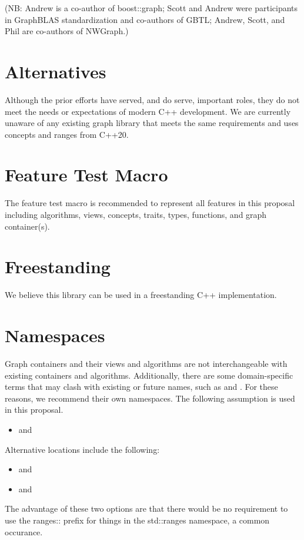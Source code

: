 (NB: Andrew is a co-author of boost::graph; 
Scott and Andrew were participants in GraphBLAS standardization
and co-authors of GBTL; Andrew, Scott, and Phil are 
co-authors of NWGraph.)

\section{Alternatives}
Although the prior efforts have served, and do serve, important roles,
they do not meet the needs or expectations of modern C++ development.
We are currently
unaware of any existing graph
library that meets the same requirements and uses concepts and ranges from C++20.


\section{Feature Test Macro}
The  feature test macro is recommended to represent all features in this proposal including algorithms, views, concepts, traits, types, functions, and graph container(s).

\section{Freestanding}
We believe this library can be used in a freestanding C++ implementation.

\section{Namespaces}
Graph containers and their views and algorithms are not interchangeable with existing containers and algorithms.
Additionally, there are some domain-specific terms that may clash with existing or future names, such as 
 and .
For these reasons, we recommend their own namespaces. The following assumption is used in this proposal.
\begin{itemize}
\item[] and 
\end{itemize}

\noindent
Alternative locations include the following:
\begin{itemize}
\item[] and 
\item[] and 
\end{itemize}
The advantage of these two options are that there would be no requirement to use the ranges:: prefix for things
in the std::ranges namespace, a common occurance.

